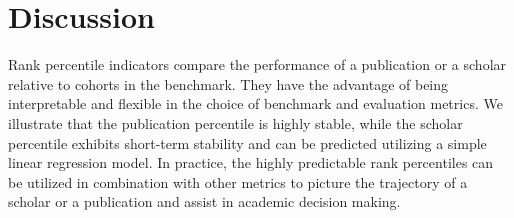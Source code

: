 \section*{Discussion}

Rank percentile indicators compare the performance of a publication or a scholar relative to cohorts in the benchmark. They have the advantage of being interpretable and flexible in the choice of benchmark and evaluation metrics. We illustrate that the publication percentile is highly stable, while the scholar percentile exhibits short-term stability and can be predicted utilizing a simple linear regression model. In practice, the highly predictable rank percentiles can be utilized in combination with other metrics to picture the trajectory of a scholar or a publication and assist in academic decision making. 
